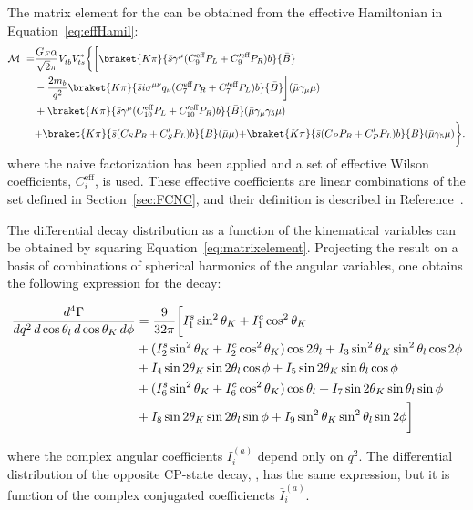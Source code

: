 The matrix element for the \BtoKstmumudecay can be obtained from the effective Hamiltonian in Equation~\ref{eq:effHamil}:
\begin{equation}\label{eq:matrixelement}
  \begin{split}
    {\mathcal M}\ =& \frac{G_F\alpha}{\sqrt{2}\pi}V_{tb}^{}V_{ts}^*\bigg\{\bigg[ \braket{K \pi}{\bar{s}\gamma^{\mu}({C_9^\text{eff}P_L+C_9^{\prime\text{eff}} P_R})b}{\bar B} \\
      &-\frac{2m_b}{q^2}\braket{K\pi}{\bar{s}i\sigma^{\mu\nu}q_{\nu}(C_7^\text{eff} P_R+C_7^{\prime\text{eff}}  P_L)b}{\bar B}\bigg](\bar{\mu}\gamma_{\mu}\mu)\\
    &+ \braket{K\pi}{\bar{s}\gamma^{\mu}({C_{10}^\text{eff} P_L+C_{10}^{\prime\text{eff}} P_R})b}{\bar B}(\bar{\mu}\gamma_{\mu}\gamma_5 \mu) \\
    & {+\braket{K \pi}{\bar{s} ({C_S P_R+C_S^\prime P_L}) b}{\bar B}(\bar{\mu}\mu)}{+\braket{K \pi}{\bar{s} ({C_P P_R+C_P^\prime P_L}) b}{\bar B}(\bar{\mu}\gamma_5\mu)} \bigg \}.
  \end{split}
\end{equation}
where the naive factorization has been applied and a set of effective Wilson coefficients, $C_{i}^\text{eff}$, is used.
These effective coefficients are linear combinations of the set defined in Section~\ref{sec:FCNC}, and their definition is described in Reference~\cite{Altmannshofer:2008dz}.

The differential decay distribution as a function of the kinematical variables can be obtained by squaring Equation~\ref{eq:matrixelement}.
Projecting the result on a basis of combinations of spherical harmonics of the angular variables, one obtains the following expression for the \BtoKstmumuconjdecay decay:
\begin{small}
  \begin{align} \label{eq:angulardist}
    \frac{d^4\Gamma}{dq^2\, d\cos\theta_l\, d\cos\theta_K\, d\phi} &=\frac{9}{32\pi}\bigg[ I_1^s\sin^2\theta_K + I_1^c\cos^2\theta_K \nonumber\\
      & + (I_2^s\sin^2\theta_K + I_2^c\cos^2\theta_K)\cos2\theta_l + I_3 \sin^2\theta_K \sin^2\theta_l \cos 2\phi \nonumber \\
      & + I_4 \sin 2\theta_K \sin 2\theta_l \cos\phi + I_5 \sin 2\theta_K \sin\theta_l \cos\phi \nonumber \\
      & + (I_6^s \sin^2\theta_K + {I_6^c \cos^2\theta_K})  \cos\theta_l + I_7 \sin 2\theta_K \sin\theta_l \sin\phi \nonumber \\
    & + I_8 \sin 2\theta_K \sin 2\theta_l \sin\phi + I_9 \sin^2\theta_K \sin^2\theta_l \sin 2\phi \bigg]
  \end{align}
\end{small}
where the complex angular coefficients $I_i^{(a)}$ depend only on $q^2$.
The differential distribution of the opposite CP-state decay, \BtoKstmumudecay, has the same expression, but it is function of the complex conjugated coefficiencts $\bar{I}_i^{(a)}$.

